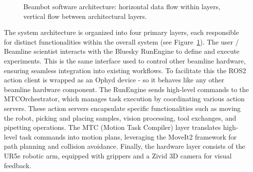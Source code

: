 \documentclass[12pt, a4paper]{article}
\begin{document}
\begin{figure}[H]
\caption{Beambot software architecture: horizontal data flow within layers, vertical flow between architectural layers.}
\label{fig:software-stack}
\end{figure}

The system architecture is organized into four primary layers, each responsible for distinct functionalities within the overall system (see Figure~\ref{fig:software-stack}). The user / Beamline scientist interacts with the Bluesky RunEngine to define and execute experiments. 
This is the same interface used to control other beamline hardware, ensuring seamless integration into existing workflows. To facilitate this the ROS2 action client is wrapped as an Ophyd device - so it behaves like any other beamline hardware component.
The RunEngine sends high-level commands to the MTCOrchestrator, which manages task execution by coordinating various action servers. These action servers encapsulate specific functionalities such as moving the robot, picking and placing samples, vision processing, tool exchanges, and pipetting operations.
The MTC (Motion Task Compiler) layer translates high-level task commands into motion plans, leveraging the MoveIt2 framework for path planning and collision avoidance.
Finally, the hardware layer consists of the UR5e robotic arm, equipped with grippers and a Zivid 3D camera for visual feedback.
\end{document}
